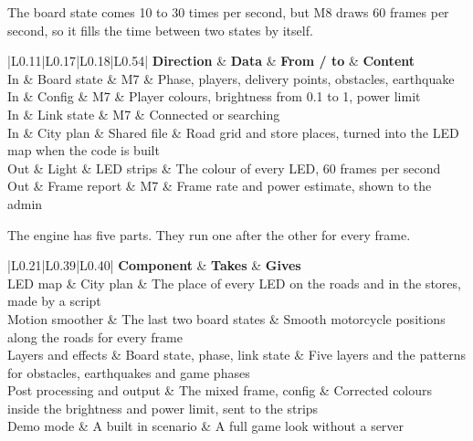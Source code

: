 \documentclass[
  english,
  10pt,
  a4paper,
]{article}
\newcommand{\ckkeep}[1]{\par\noindent\begin{minipage}{\linewidth}\setlength{\parskip}{4pt}#1\end{minipage}\par\smallskip}
\begin{document}

\ckkeep{%
The board state comes 10 to 30 times per second, but M8 draws 60 frames per second, so it fills the
time between two states by itself.

\begin{tabular}{|L{0.11}|L{0.17}|L{0.18}|L{0.54}|}
\hline \textbf{Direction} & \textbf{Data} & \textbf{From / to} & \textbf{Content} \\ \hline 
In & Board state & M7 & Phase, players, delivery points, obstacles, earthquake \\ \hline
In & Config & M7 & Player colours, brightness from 0.1 to 1, power limit \\ \hline
In & Link state & M7 & Connected or searching \\ \hline
In & City plan & Shared file & Road grid and store places, turned into the LED map when the code is built \\ \hline
Out & Light & LED strips & The colour of every LED, 60 frames per second \\ \hline
Out & Frame report & M7 & Frame rate and power estimate, shown to the admin \\ \hline
\end{tabular}}


\ckkeep{%
The engine has five parts. They run one after the other for every frame.

\begin{tabular}{|L{0.21}|L{0.39}|L{0.40}|}
\hline \textbf{Component} & \textbf{Takes} & \textbf{Gives} \\ \hline 
LED map & City plan & The place of every LED on the roads and in the stores, made by a script \\ \hline
Motion smoother & The last two board states & Smooth motorcycle positions along the roads for every frame \\ \hline
Layers and effects & Board state, phase, link state & Five layers and the patterns for obstacles, earthquakes and game phases \\ \hline
Post processing and output & The mixed frame, config & Corrected colours inside the brightness and power limit, sent to the strips \\ \hline
Demo mode & A built in scenario & A full game look without a server \\ \hline
\end{tabular}}

\end{document}
